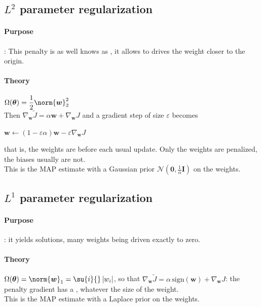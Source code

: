 \subsection{$L^{2}$ parameter regularization}
\paragraph{Purpose}: This penalty is as well knows as , it allows
to drives the weight closer to the origin.

\paragraph{Theory}
$\Omega(\bm{\theta}) = \dfrac{1}{2}\norm{\bm{w}}^{2}_{2}$\\
Then $\nabla_{\bm{w}}\tilde{J} = \alpha\bm{w} + \nabla_{\bm{w}}J$ and a gradient step of
size $\varepsilon$ becomes
\begin{center}
    $\bm{w} \leftarrow \left(1 - \varepsilon\alpha\right)\bm{w}
    - \varepsilon\nabla_{\bm{w}}J$
\end{center}
that is, the weights are  before each usual update.
Only the weights are penalized, the biases usually are not.\\
This is the MAP estimate with a Gaussian prior $\mathcal{N}\left(\bm{0},
\frac{1}{\alpha}\bm{I}\right)$ on the weights.

\subsection{$L^{1}$ parameter regularization}
\paragraph{Purpose}: it yields  solutions, many weights being driven exactly to
zero.

\paragraph{Theory}
$\Omega(\bm{\theta}) = \norm{\bm{w}}_{1} = \su{i}{}\left|w_{i}\right|$, so that
$\nabla_{\bm{w}}\tilde{J} = \alpha\,\mathrm{sign}(\bm{w}) + \nabla_{\bm{w}}J$: the
penalty gradient has a , whatever the size of the weight.\\
This is the MAP estimate with a Laplace prior on the weights.
